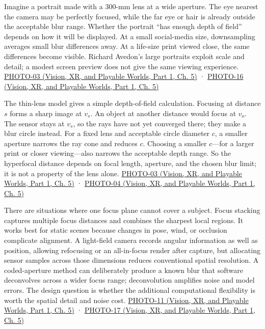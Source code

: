 \hypertarget{03-visual-computing-i-ch003-focus-is-determined-by-a-tolerance-and-an-output}{}

Imagine a portrait made with a 300-mm lens at a wide aperture. The eye nearest the camera may be perfectly focused, while the far eye or hair is already outside the acceptable blur range. Whether the portrait ``has enough depth of field'' depends on how it will be displayed. At a small social-media size, downsampling averages small blur differences away. At a life-size print viewed close, the same differences become visible. Richard Avedon's large portraits exploit scale and detail; a modest screen preview does not give the same viewing experience. \href{../07-Vision-XR-and-Playable-Worlds-P01/main.pdf\#nameddest=04-visual-computing-ii-ch036-photo-03---photography-session-03}{PHOTO-03 (Vision, XR, and Playable Worlds, Part 1, Ch. 5)} · \href{../07-Vision-XR-and-Playable-Worlds-P01/main.pdf\#nameddest=04-visual-computing-ii-ch036-photo-16---photography-session-16}{PHOTO-16 (Vision, XR, and Playable Worlds, Part 1, Ch. 5)}

The thin-lens model gives a simple depth-of-field calculation. Focusing at distance \(s\) forms a sharp image at \(v_s\). An object at another distance would focus at \(v_o\). The sensor stays at \(v_s\), so the rays have not yet converged there; they make a blur circle instead. For a fixed lens and acceptable circle diameter \(c\), a smaller aperture narrows the ray cone and reduces \(c\). Choosing a smaller \(c\)---for a larger print or closer viewing---also narrows the acceptable depth range. So the hyperfocal distance depends on focal length, aperture, and the chosen blur limit; it is not a property of the lens alone. \href{../07-Vision-XR-and-Playable-Worlds-P01/main.pdf\#nameddest=04-visual-computing-ii-ch036-photo-03---photography-session-03}{PHOTO-03 (Vision, XR, and Playable Worlds, Part 1, Ch. 5)} · \href{../07-Vision-XR-and-Playable-Worlds-P01/main.pdf\#nameddest=04-visual-computing-ii-ch036-photo-04---photography-session-04}{PHOTO-04 (Vision, XR, and Playable Worlds, Part 1, Ch. 5)}

There are situations where one focus plane cannot cover a subject. Focus stacking captures multiple focus distances and combines the sharpest local regions. It works best for static scenes because changes in pose, wind, or occlusion complicate alignment. A light-field camera records angular information as well as position, allowing refocusing or an all-in-focus render after capture, but allocating sensor samples across those dimensions reduces conventional spatial resolution. A coded-aperture method can deliberately produce a known blur that software deconvolves across a wider focus range; deconvolution amplifies noise and model errors. The design question is whether the additional computational flexibility is worth the spatial detail and noise cost. \href{../07-Vision-XR-and-Playable-Worlds-P01/main.pdf\#nameddest=04-visual-computing-ii-ch036-photo-11---photography-session-11}{PHOTO-11 (Vision, XR, and Playable Worlds, Part 1, Ch. 5)} · \href{../07-Vision-XR-and-Playable-Worlds-P01/main.pdf\#nameddest=04-visual-computing-ii-ch036-photo-17---photography-session-17}{PHOTO-17 (Vision, XR, and Playable Worlds, Part 1, Ch. 5)}

